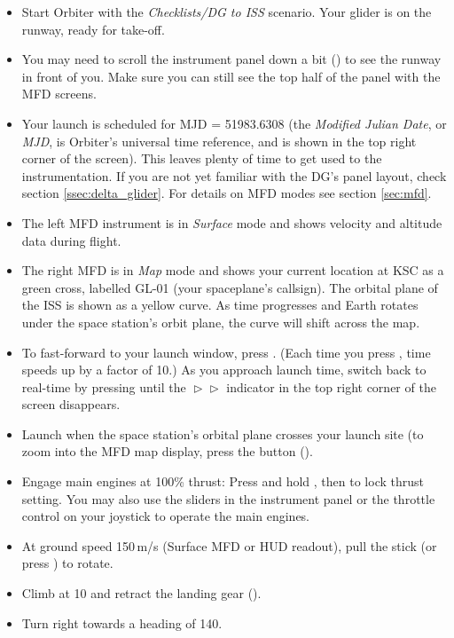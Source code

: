 \documentclass[Orbiter User Manual.tex]{subfiles}
\begin{document}
\begin{itemize}
	\item Start Orbiter with the \emph{Checklists/DG to ISS} scenario. Your
		glider is on the runway, ready for take-off.
	\item You may need to scroll the instrument panel down a bit (\UArrow\cur{})
		to see the runway in front of you. Make sure you can still see the top
		half of the panel with the MFD screens.
	\item Your launch is scheduled for MJD = 51983.6308 (the \emph{Modified
		Julian Date}, or \emph{MJD}, is Orbiter's universal time reference, and
		is shown in the top right corner of the screen). This leaves plenty of
		time to get used to the instrumentation. If you are not yet familiar
		with the DG's panel layout, check section \ref{ssec:delta_glider}. For
		details on MFD modes see section \ref{sec:mfd}.
	\item The left MFD instrument is in \emph{Surface} mode and shows velocity
		and altitude data during flight.
	\item The right MFD is in \emph{Map} mode and shows your current location at
		KSC as a green cross, labelled GL-01 (your spaceplane's callsign). The
		orbital plane of the ISS is shown as a yellow curve. As time progresses
		and Earth rotates under the space station's orbit plane, the curve will
		shift across the map.
	\item To fast-forward to your launch window, press . (Each time
		you press , time speeds up by a factor of 10.) As you
		approach launch time, switch back to real-time by pressing 
		until the $\vartriangleright\vartriangleright$ indicator in the top
		right corner of the screen disappears.
	\item Launch when the space station's orbital plane crosses your launch site
		(to zoom into the MFD map display, press the  button
		().
	\item Engage main engines at 100\% thrust: Press and hold
		\keystroke{+}\num{}, then \Ctrl{} to lock thrust setting. You may also
		use the sliders in the instrument panel or the throttle control on your
		joystick to operate the main engines.
	\item At ground speed 150\,m/s (Surface MFD or HUD readout), pull the stick
		(or press \num{}) to rotate.
	\item Climb at 10\deg{} and retract the landing gear ().
	\item Turn right towards a heading of 140\deg{}.

\end{itemize}
\end{document}
